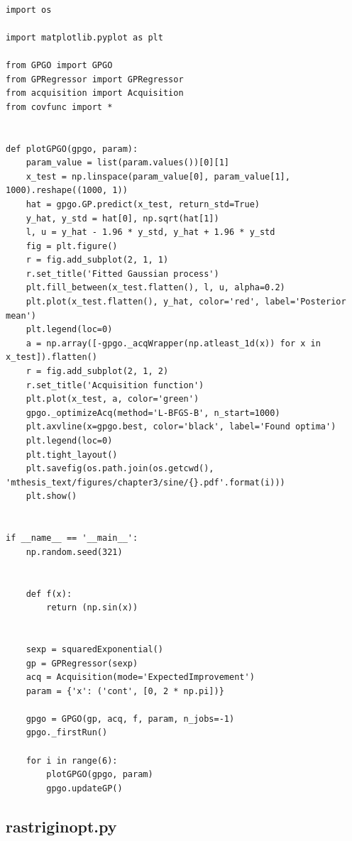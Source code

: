 \documentclass[10pt,a4paper,twoside]{book}
\begin{document}
\begin{verbatim}

import os

import matplotlib.pyplot as plt

from GPGO import GPGO
from GPRegressor import GPRegressor
from acquisition import Acquisition
from covfunc import *


def plotGPGO(gpgo, param):
    param_value = list(param.values())[0][1]
    x_test = np.linspace(param_value[0], param_value[1], 1000).reshape((1000, 1))
    hat = gpgo.GP.predict(x_test, return_std=True)
    y_hat, y_std = hat[0], np.sqrt(hat[1])
    l, u = y_hat - 1.96 * y_std, y_hat + 1.96 * y_std
    fig = plt.figure()
    r = fig.add_subplot(2, 1, 1)
    r.set_title('Fitted Gaussian process')
    plt.fill_between(x_test.flatten(), l, u, alpha=0.2)
    plt.plot(x_test.flatten(), y_hat, color='red', label='Posterior mean')
    plt.legend(loc=0)
    a = np.array([-gpgo._acqWrapper(np.atleast_1d(x)) for x in x_test]).flatten()
    r = fig.add_subplot(2, 1, 2)
    r.set_title('Acquisition function')
    plt.plot(x_test, a, color='green')
    gpgo._optimizeAcq(method='L-BFGS-B', n_start=1000)
    plt.axvline(x=gpgo.best, color='black', label='Found optima')
    plt.legend(loc=0)
    plt.tight_layout()
    plt.savefig(os.path.join(os.getcwd(), 'mthesis_text/figures/chapter3/sine/{}.pdf'.format(i)))
    plt.show()


if __name__ == '__main__':
    np.random.seed(321)


    def f(x):
        return (np.sin(x))


    sexp = squaredExponential()
    gp = GPRegressor(sexp)
    acq = Acquisition(mode='ExpectedImprovement')
    param = {'x': ('cont', [0, 2 * np.pi])}

    gpgo = GPGO(gp, acq, f, param, n_jobs=-1)
    gpgo._firstRun()

    for i in range(6):
        plotGPGO(gpgo, param)
        gpgo.updateGP()

\end{verbatim}

\subsection*{rastriginopt.py}
\label{rastriginopt}
\end{document}
